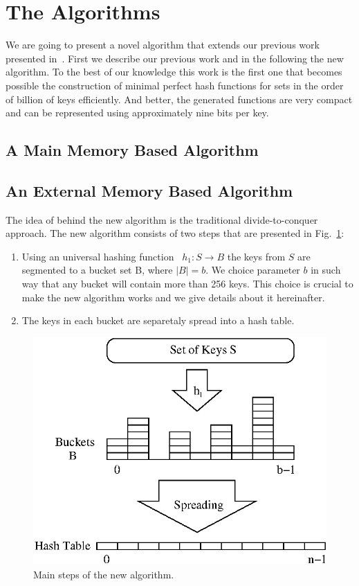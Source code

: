 \section{The Algorithms}
\label{sec:thealgorithm}
We are going to present a novel algorithm that extends our previous work
presented in~\cite{bkz05}. 
First we describe our previous work and in the following the new algorithm.
To the best of our knowledge this work is the first one that becomes possible
the construction of minimal perfect hash functions for sets in the order of 
billion of keys efficiently. 
And better, the generated functions are very compact and can be represented 
using approximately nine bits per key.

\subsection{A Main Memory Based Algorithm}

\subsection{An External Memory Based Algorithm}
The idea of behind the new algorithm is the traditional divide-to-conquer approach. 
The new algorithm consists of two steps that are presented in Fig.~\ref{fig:new-algo-main-steps}:
\begin{enumerate}
\item Using an universal hashing function~\cite{ss89} $h_1: S \to B$ the keys from $S$ are segmented to
a bucket set B, where $|B| = b$. We choice parameter $b$ in such way that any bucket will
contain more than 256 keys. 
This choice is crucial to make the new algorithm works and we give details about it hereinafter. 
\item The keys in each bucket are separetaly spread into a hash table.
\end{enumerate}
\begin{figure}
\centering
  \includegraphics{figs/brz.ps}
\caption{Main steps of the new algorithm.}
\label{fig:new-algo-main-steps}
\end{figure}

